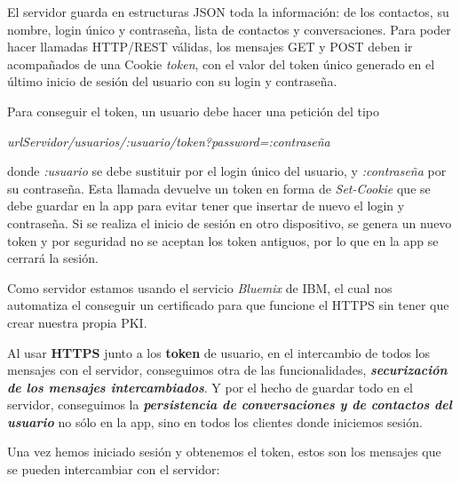 \documentclass[]{article}
\begin{document}
El servidor guarda en estructuras JSON toda la información: de los contactos, su nombre, login único y contraseña, lista de contactos y conversaciones. Para poder hacer llamadas HTTP/REST válidas, los mensajes GET y POST deben ir acompañados de una Cookie \textit{token}, con el valor del token único generado en el último inicio de sesión del usuario con su login y contraseña.

Para conseguir el token, un usuario debe hacer una petición del tipo

 \textit{urlServidor/usuarios/:usuario/token?password=:contraseña}
 
  donde \textit{:usuario} se debe sustituir por el login único del usuario, y \textit{:contraseña} por su contraseña. Esta llamada devuelve un token en forma de \textit{Set-Cookie} que se debe guardar en la app para evitar tener que insertar de nuevo el login y contraseña. Si se realiza el inicio de sesión en otro dispositivo, se genera un nuevo token y por seguridad no se aceptan los token antiguos, por lo que en la app se cerrará la sesión.

\hfill

Como servidor estamos usando el servicio \textit{Bluemix} de IBM, el cual nos automatiza el conseguir un certificado para que funcione el HTTPS sin tener que crear nuestra propia PKI.

\hfill

Al usar \textbf{HTTPS} junto a los \textbf{token} de usuario, en el intercambio de todos los mensajes con el servidor, conseguimos otra de las funcionalidades, \textbf{\textit{securización de los mensajes intercambiados}}. Y por el hecho de guardar todo en el servidor, conseguimos la \textbf{\textit{persistencia de conversaciones y de contactos del usuario}} no sólo en la app, sino en todos los clientes donde iniciemos sesión.

\hfill

Una vez hemos iniciado sesión y obtenemos el token, estos son los mensajes que se pueden intercambiar con el servidor:
\end{document}
